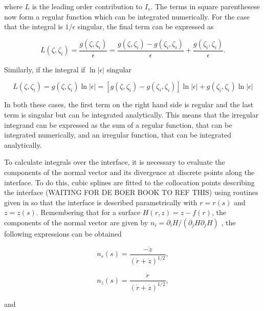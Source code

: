 \documentclass[12pt]{article}
\begin{document}
where $L$ is the leading order contribution to $I_{s}$. The terms in square parenthesese now form a regular function which can be integrated numerically. For the case that the integral is $1/\epsilon$ singular, the final term can be expressed as

\begin{equation}
\label{equ:recip_sing}
L(\zeta, \zeta_{i}) = \frac{g(\zeta, \zeta_{i})}{\epsilon} = \frac{g(\zeta, \zeta_{i}) - g(\zeta_{i}, \zeta_{i})}{\epsilon} + \frac{g(\zeta_{i}, \zeta_{i})}{\epsilon}.
\end{equation}

Similarly, if the integral if $\ln|\epsilon|$ singular

\begin{equation}
\label{equ:ln_sing}
L(\zeta, \zeta_{i}) = g(\zeta, \zeta_{i}) \ln|\epsilon| = [g(\zeta, \zeta_{i}) - g(\zeta_{i}, \zeta_{i})]\ln|\epsilon| + g(\zeta_{i}, \zeta_{i})\ln|\epsilon|
\end{equation}

In both these cases, the first term on the right hand side is regular and the last term is singular but can be integrated analytically. This means that the irregular integrand can be expressed as the sum of a regular function, that can be integrated numerically, and an irregular function, that can be integrated analytically. 
 
To calculate integrals over the interface, it is necessary to evaluate the components of the normal vector and its divergence at discrete points along the interface. To do this, cubic splines are fitted to the collocation points describing the interface (WAITING FOR DE BOER BOOK TO REF THIS) using routines given in \citet{Press07} so that the interface is described parametrically with $r = r(s)$ and $z = z(s)$. Remembering that for a surface $H(r,z) = z - f(r)$, the components of the normal vector are given by $n_{i} = \partial_{i} H / (\partial_{j}H \partial_{j}H)$ \citep{Riley06}, the following expressions can be obtained

\begin{equation}
\label{equ:norm_rad}
n_{r}(s) = \frac{-\dot{z}}{(\dot{r} + \dot{z})^{1/2}},
\end{equation}

\begin{equation}
\label{equ:norm_vert}
n_{z}(s) = \frac{\dot{r}}{(\dot{r} + \dot{z})^{1/2}},
\end{equation}

and 
\end{document}

